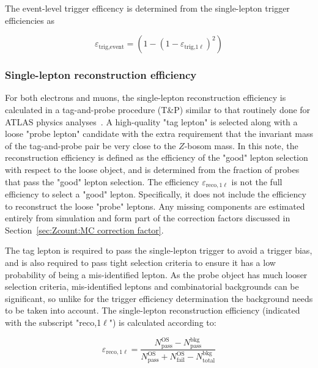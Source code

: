 The event-level trigger efficency is determined from the single-lepton trigger efficiencies as

\begin{equation}
	\varepsilon_\text{trig,event}=\left( 1 - (1-\varepsilon_{\text{trig,}1\ell})^2 \right)
\end{equation}

\subsubsection{Single-lepton reconstruction efficiency}

For both electrons and muons, the single-lepton reconstruction efficiency is calculated in a tag-and-probe procedure (T\&P) similar to that routinely done for ATLAS physics analyses~\cite{ATLAS:2016lqx, ATLAS:2019qmc}. A high-quality "tag lepton" is selected along with a loose "probe lepton" candidate with the extra requirement that the invariant mass of the tag-and-probe pair be very close to the $Z$-bosom mass. In this note, the reconstruction efficiency is defined as the efficiency of the "good" lepton selection with respect to the loose object, and is determined from the fraction of probes that pass the "good" lepton selection. The efficiency $\varepsilon_{\text{reco},1\ell}$ is not the full efficiency to select a "good" lepton. Specifically, it does not include the efficiency to reconstruct the loose "probe" leptons. Any missing components are estimated entirely from simulation and form part of the correction factors discussed in Section~\ref{sec:Zcount:MC correction factor}.

The tag lepton is required to pass the single-lepton trigger to avoid a trigger bias, and is also required to pass tight selection criteria to ensure it has a low probability of being a mis-identified lepton. As the probe object has much looser selection criteria, mis-identified leptons and combinatorial backgrounds can be significant, so unlike for the trigger efficiency determination the background needs to be taken into account. The single-lepton reconstruction efficiency (indicated with the subscript "reco,1$\ell$") is calculated according to:

\begin{equation}
	\varepsilon_{\text{reco},1\ell}=\frac{N^\text{OS}_\text{pass}-N^\text{bkg}_\text{pass}}{N^\text{OS}_\text{pass}+N^\text{OS}_\text{fail}-N^\text{bkg}_\text{total}}
	\label{eq:Zcount:Single-lep reco eff}
\end{equation}

